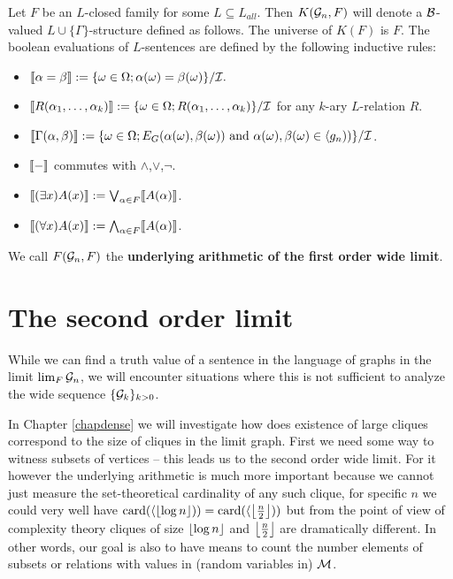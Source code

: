 \begin{defi}
Let $F$ be an $L$-closed family for some $L\subseteq L_{all}$. Then $K(\mathcal{G}_n,F)$ will denote a $\mathcal{B}$-valued $L\cup\{\Gamma\}$-structure defined as follows. The universe of $K(F)$ is $F$. The boolean evaluations of $L$-sentences are defined by the following inductive rules:

\begin{itemize}
\item $\llbracket \alpha=\beta \rrbracket := \{\omega\in\Omega; \alpha(\omega)=\beta(\omega)\}/\mathcal{I}.$
\item $\llbracket R(\alpha_1,\dots,\alpha_k) \rrbracket := \{\omega\in\Omega; R(\alpha_1,\dots,\alpha_k)\}/\mathcal{I}$ for any $k$-ary $L$-relation $R$.
\item $\llbracket \Gamma(\alpha,\beta) \rrbracket := \{\omega\in\Omega; E_G(\alpha(\omega),\beta(\omega))\text{ and }\alpha(\omega),\beta(\omega)\in\langle g_n))\}/\mathcal{I}$.
\item $\llbracket-\rrbracket$ commutes with $\land$,$\lor$,$\lnot$.
\item $\llbracket(\exists x)A(x)\rrbracket:=\bigvee_{\alpha\in F}\llbracket A(\alpha)\rrbracket$.
\item $\llbracket(\forall x)A(x)\rrbracket:=\bigwedge_{\alpha\in F}\llbracket A(\alpha)\rrbracket$.
\end{itemize}

We call $F(\mathcal{G}_n,F)$ the \textbf{underlying arithmetic of the first order wide limit}.
\end{defi}


\section{The second order limit}

While we can find a truth value of a sentence in the language of graphs in the limit $\lim_{F}\mathcal{G}_n$, we will encounter situations where this is not sufficient to analyze the wide sequence $\{\mathcal{G}_k\}_{k>0}$. 

In Chapter \ref{chapdense} we will investigate how does existence of large cliques correspond to the size of cliques in the limit graph. First we need some way to witness subsets of vertices -- this leads us to the second order wide limit. For it however the underlying arithmetic is much more important because we cannot just measure the set-theoretical cardinality of any such clique, for specific $n$ we could very well have $\text{card}(\langle \left \lfloor {\log{n}} \right \rfloor))=\text{card}(\langle \left \lfloor {\frac{n}{2}} \right \rfloor))$ but from the point of view of complexity theory cliques of size $\left \lfloor {\log n} \right \rfloor$ and $\left \lfloor {\frac{n}{2}} \right \rfloor$ are dramatically different. In other words, our goal is also to have means to count the number elements of subsets or relations with values in (random variables in) $\mathcal{M}$.

